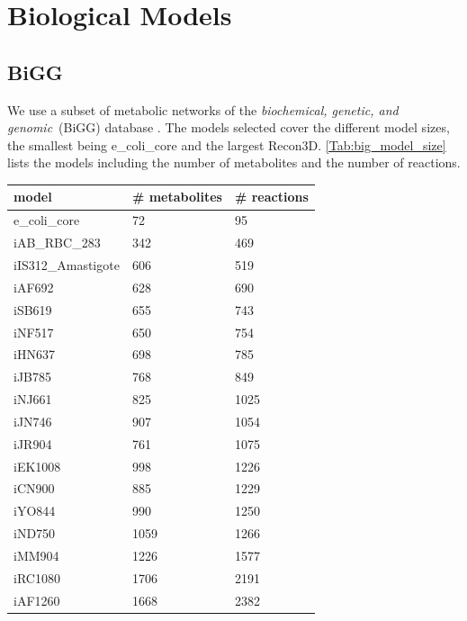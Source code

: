 \newpage
\section{Biological Models} \label{section:models}
\subsection{BiGG}
We use a subset of metabolic networks of the \textit{biochemical, genetic, and genomic}~(BiGG) database \cite{BiGG}. The models selected cover the different model sizes, the smallest being \textsf{e\_coli\_core} and the largest \textsf{Recon3D}. \cref{Tab:big_model_size} lists the models including the number of metabolites and the number of reactions.

\begin{table}[!ht]
    \centering
    \small
    \begin{tabular}{lll}
    \hline
        \textbf{model} & \textbf{\# metabolites} & \textbf{\# reactions} \\ \hline
        \textsf{e\_coli\_core} & 72 & 95 \\ 
        \textsf{iAB\_RBC\_283} & 342 & 469 \\ 
        \textsf{iIS312\_Amastigote} & 606 & 519 \\ 
        \textsf{iAF692} & 628 & 690 \\ 
        \textsf{iSB619} & 655 & 743 \\ 
        \textsf{iNF517} & 650 & 754 \\ 
        \textsf{iHN637} & 698 & 785 \\ 
        \textsf{iJB785} & 768 & 849 \\ 
        \textsf{iNJ661} & 825 & 1025 \\ 
        \textsf{iJN746} & 907 & 1054 \\ 
        \textsf{iJR904} & 761 & 1075 \\ 
        \textsf{iEK1008} & 998 & 1226 \\ 
        \textsf{iCN900} & 885 & 1229 \\ 
        \textsf{iYO844} & 990 & 1250 \\ 
        \textsf{iND750} & 1059 & 1266 \\ 
        \textsf{iMM904} & 1226 & 1577 \\ 
        \textsf{iRC1080} & 1706 & 2191 \\ 
        \textsf{iAF1260} & 1668 & 2382 \\ 

\end{tabular}
\end{table}
